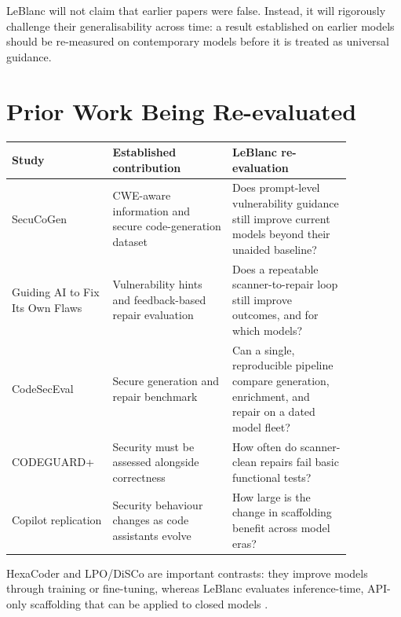 \documentclass[11pt,a4paper]{article}
\begin{document}
LeBlanc will not claim that earlier papers were false. Instead, it will rigorously challenge their generalisability across time: a result established on earlier models should be re-measured on contemporary models before it is treated as universal guidance.

\section{Prior Work Being Re-evaluated}
\begin{center}
\begin{tabular}{p{0.22\linewidth}p{0.32\linewidth}p{0.32\linewidth}}
\toprule
Study & Established contribution & LeBlanc re-evaluation \\
\midrule
SecuCoGen \cite{secucogen} & CWE-aware information and secure code-generation dataset & Does prompt-level vulnerability guidance still improve current models beyond their unaided baseline? \\
Guiding AI to Fix Its Own Flaws \cite{guiding} & Vulnerability hints and feedback-based repair evaluation & Does a repeatable scanner-to-repair loop still improve outcomes, and for which models? \\
CodeSecEval \cite{codesec} & Secure generation and repair benchmark & Can a single, reproducible pipeline compare generation, enrichment, and repair on a dated model fleet? \\
CODEGUARD+ \cite{codeguard} & Security must be assessed alongside correctness & How often do scanner-clean repairs fail basic functional tests? \\
Copilot replication \cite{copilot} & Security behaviour changes as code assistants evolve & How large is the change in scaffolding benefit across model eras? \\
\bottomrule
\end{tabular}
\end{center}

HexaCoder and LPO/DiSCo are important contrasts: they improve models through training or fine-tuning, whereas LeBlanc evaluates inference-time, API-only scaffolding that can be applied to closed models \cite{hexacoder,lpo}.
\end{document}
